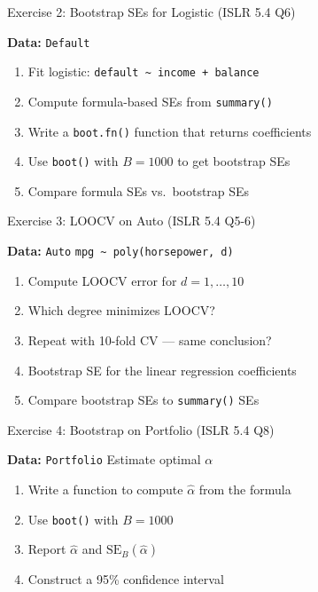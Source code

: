 \documentclass[aspectratio=169, 11pt]{beamer}
\begin{document}
\begin{frame}{Exercise 2: Bootstrap SEs for Logistic (ISLR 5.4 Q6)}

\textbf{Data:} \texttt{Default}

\begin{enumerate}
  \item Fit logistic: \texttt{default \textasciitilde{} income + balance}
  \item Compute formula-based SEs from \texttt{summary()}
  \item Write a \texttt{boot.fn()} function that returns coefficients
  \item Use \texttt{boot()} with $B = 1000$ to get bootstrap SEs
  \item Compare formula SEs vs.\ bootstrap SEs
\end{enumerate}
\end{frame}


\begin{frame}{Exercise 3: LOOCV on Auto (ISLR 5.4 Q5-6)}

\textbf{Data:} \texttt{Auto} \hfill \texttt{mpg \textasciitilde{} poly(horsepower, d)}

\begin{enumerate}
  \item Compute LOOCV error for $d = 1, \ldots, 10$
  \item Which degree minimizes LOOCV?
  \item Repeat with 10-fold CV --- same conclusion?
  \item Bootstrap SE for the linear regression coefficients
  \item Compare bootstrap SEs to \texttt{summary()} SEs
\end{enumerate}

\end{frame}


\begin{frame}{Exercise 4: Bootstrap on Portfolio (ISLR 5.4 Q8)}

\textbf{Data:} \texttt{Portfolio} \hfill Estimate optimal $\alpha$

\begin{enumerate}
  \item Write a function to compute $\hat{\alpha}$ from the formula
  \item Use \texttt{boot()} with $B = 1000$
  \item Report $\hat{\alpha}$ and $\text{SE}_B(\hat{\alpha})$
  \item Construct a 95\% confidence interval
\end{enumerate}
\end{frame}
\end{document}
